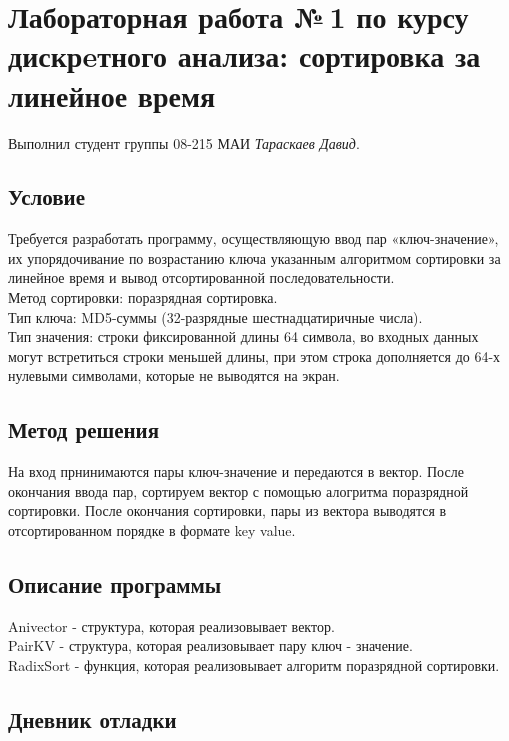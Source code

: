 \documentclass[12pt]{article}
\begin{document}
\section*{Лабораторная работа №\,1 по курсу дискрeтного анализа: сортировка за линейное время}

Выполнил студент группы 08-215 МАИ \textit{Тараскаев Давид}.

\subsection*{Условие}


Требуется разработать программу, осуществляющую ввод пар «ключ-значение», их упорядочивание по возрастанию ключа указанным алгоритмом сортировки за линейное время и вывод отсортированной последовательности.\\
Метод сортировки: поразрядная сортировка.\\
Тип ключа: MD5-суммы (32-разрядные шестнадцатиричные числа).\\
Тип значения: строки фиксированной длины 64 символа, во входных данных могут встретиться строки меньшей длины, при этом строка дополняется до 64-х нулевыми символами, которые не выводятся на экран.


\subsection*{Метод решения}

На вход прнинимаются пары ключ-значение и передаются в вектор. После окончания ввода пар, сортируем вектор с помощью алогритма поразрядной сортировки. После окончания сортировки, пары из вектора выводятся в отсортированном порядке в формате key  value.

\subsection*{Описание программы}

Anivector - структура, которая реализовывает вектор.\\
PairKV - структура, которая реализовывает пару ключ - значение.\\
RadixSort - функция, которая реализовывает алгоритм поразрядной сортировки.

\subsection*{Дневник отладки}
\end{document}
